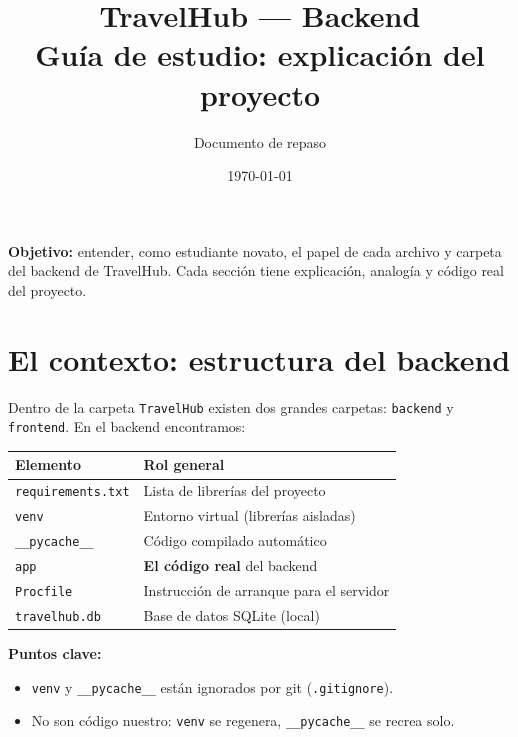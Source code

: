 \documentclass[11pt,a4paper]{article}
\title{\color{azul}\textbf{TravelHub --- Backend}\\[0.3em]
\Large Guía de estudio: explicación del proyecto}
\author{Documento de repaso}
\date{\today}
\begin{document}
\maketitle
\vspace{1em}

\begin{center}
\colorbox{azul!10}{\parbox{0.9\textwidth}{\centering
\textbf{Objetivo:} entender, como estudiante novato, el papel de cada archivo y carpeta
del backend de TravelHub. Cada sección tiene explicación, analogía y código real del proyecto.
}}
\end{center}

\tableofcontents
\newpage

\section{El contexto: estructura del backend}

Dentro de la carpeta \texttt{TravelHub} existen dos grandes carpetas: \texttt{backend} y \texttt{frontend}.
En el backend encontramos:

\begin{center}
\begin{tabular}{ll}
\toprule
\textbf{Elemento} & \textbf{Rol general} \\
\midrule
\texttt{requirements.txt} & Lista de librerías del proyecto \\
\texttt{venv} & Entorno virtual (librerías aisladas) \\
\texttt{\_\_pycache\_\_} & Código compilado automático \\
\texttt{app} & \textbf{El código real} del backend \\
\texttt{Procfile} & Instrucción de arranque para el servidor \\
\texttt{travelhub.db} & Base de datos SQLite (local) \\
\bottomrule
\end{tabular}
\end{center}

\textbf{Puntos clave:}
\begin{itemize}
    \item \texttt{venv} y \texttt{\_\_pycache\_\_} están ignorados por git (\texttt{.gitignore}).
    \item No son código nuestro: \texttt{venv} se regenera, \texttt{\_\_pycache\_\_} se recrea solo.
\end{itemize}
\end{document}
